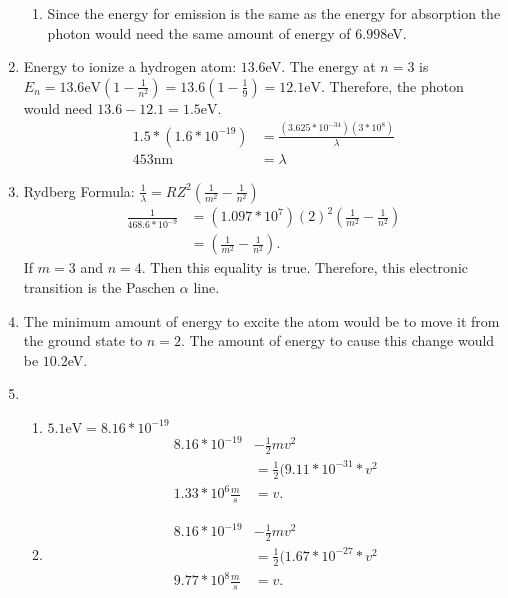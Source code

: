 \documentclass{article}
\begin{document}
\begin{enumerate}
\begin{enumerate}
        \item
        
        Since the energy for emission is the same as the energy for absorption the photon would need the same amount of energy of $6.998$eV.
        
    \end{enumerate}
    
    \item
    
    Energy to ionize a hydrogen atom: $13.6$eV. The energy at $n=3$ is $E_n = 13.6\text{eV}(1-\frac{1}{n^2}) = 13.6(1-\frac{1}{9}) = 12.1\text{eV}$. Therefore, the photon would need $13.6-12.1=1.5\text{eV}$.\\
    \begin{align*}
        1.5*(1.6*10^{-19}) &= \frac{(3.625*10^{-34})(3*10^8)}{\lambda}\\
        453\text{nm} &= \lambda
    \end{align*}
    
    \item
    
    Rydberg Formula: $\frac{1}{\lambda}=RZ^2(\frac{1}{m^2}-\frac{1}{n^2})$
    \begin{align*}
        \frac{1}{468.6*10^{-9}} &= (1.097*10^{7})(2)^2(\frac{1}{m^2}-\frac{1}{n^2})\\
         &= (\frac{1}{m^2}-\frac{1}{n^2}).
    \end{align*} If $m=3$ and $n=4$. Then this equality is true. Therefore, this electronic transition is the Paschen $\alpha$ line.
    
    \item
    
    The minimum amount of energy to excite the atom would be to move it from the ground state to $n=2$. The amount of energy to cause this change would be $10.2$eV.
    
    \item
    
    \begin{enumerate}
        \item 
        
        $5.1\text{eV} = 8.16*10^{-19}$
        \begin{align*}
            8.16*10^{-19} &- \frac{1}{2}mv^2\\
            &= \frac{1}{2}(9.11*10^{-31}*v^2\\
            1.33*10^6 \frac{m}{s} &= v.
        \end{align*}
        
        \item
        
        \begin{align*}
            8.16*10^{-19} &- \frac{1}{2}mv^2\\
            &= \frac{1}{2}(1.67*10^{-27}*v^2\\
            9.77*10^8 \frac{m}{s} &= v.
        \end{align*}
        
    \end{enumerate}
    
\end{enumerate}
\end{document}
